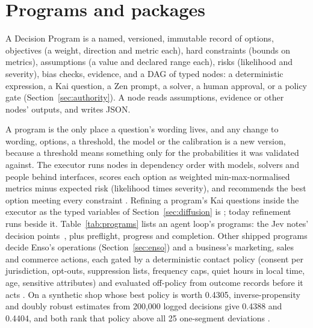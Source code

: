 \section{Programs and packages}
\label{sec:programs}

\begin{definition}
A Decision Program is a named, versioned, immutable record of options,
objectives (a weight, direction and metric each), hard constraints (bounds on
metrics), assumptions (a value and declared range each), risks (likelihood and
severity), bias checks, evidence, and a DAG of typed nodes: a deterministic
expression, a Kai question, a Zen prompt, a solver, a human approval, or a
policy gate (Section~\ref{sec:authority}). A node reads assumptions, evidence
or other nodes' outputs, and writes JSON.
\end{definition}

A program is the only place a question's wording lives, and any change to
wording, options, a threshold, the model or the calibration is a new version,
because a threshold means something only for the probabilities it was validated
against. The executor runs nodes in dependency order with models, solvers and
people behind interfaces, scores each option as weighted min-max-normalised
metrics minus expected risk (likelihood times severity), and recommends the
best option meeting every constraint \shipped. Refining a program's Kai
questions inside the executor as the typed variables of
Section~\ref{sec:diffusion} is \proposed; today refinement runs beside it.
Table~\ref{tab:programs} lists an agent loop's programs: the Jev notes'
decision points~\cite{jevnote}, plus preflight, progress and completion. Other
shipped programs decide Enso's operations (Section~\ref{sec:enso}) and a
business's marketing, sales and commerce actions, each gated by a deterministic
contact policy (consent per jurisdiction, opt-outs, suppression lists,
frequency caps, quiet hours in local time, age, sensitive attributes) and
evaluated off-policy from outcome records before it acts \shipped. On a
synthetic shop whose best policy is worth 0.4305, inverse-propensity and doubly
robust estimates from 200{,}000 logged decisions give 0.4388 and 0.4404, and
both rank that policy above all 25 one-segment deviations \meas.

